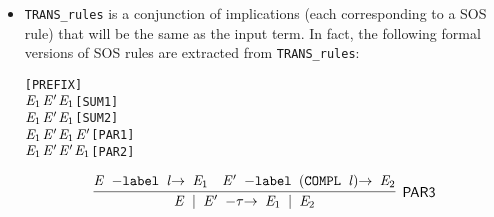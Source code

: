 \begin{itemize}
  \item \texttt{TRANS_rules} is a conjunction of implications (each
    corresponding to a SOS rule) that will be the
    same as the input term. In fact, the following formal versions of SOS rules are
    extracted from \texttt{TRANS_rules}:
\begin{alltt}
\HOLTokenTurnstile{} \HOLSymConst{\ensuremath{\ldotp}} \HOLTokenTransBegin{}\HOLTokenTransEnd {}\hfill\texttt{[PREFIX]}
\HOLTokenTurnstile{}  \HOLTokenTransBegin{}\HOLTokenTransEnd \ensuremath{\HOLFreeVar{E}\sb{\mathrm{1}}} \HOLSymConst{\HOLTokenImp{}}  \HOLSymConst{\ensuremath{+}} \ensuremath{\HOLFreeVar{E}\sp{\prime}} \HOLTokenTransBegin{}\HOLTokenTransEnd \ensuremath{\HOLFreeVar{E}\sb{\mathrm{1}}}\hfill\texttt{[SUM1]}
\HOLTokenTurnstile{}  \HOLTokenTransBegin{}\HOLTokenTransEnd \ensuremath{\HOLFreeVar{E}\sb{\mathrm{1}}} \HOLSymConst{\HOLTokenImp{}} \ensuremath{\HOLFreeVar{E}\sp{\prime}} \HOLSymConst{\ensuremath{+}}  \HOLTokenTransBegin{}\HOLTokenTransEnd \ensuremath{\HOLFreeVar{E}\sb{\mathrm{1}}}\hfill\texttt{[SUM2]}
\HOLTokenTurnstile{}  \HOLTokenTransBegin{}\HOLTokenTransEnd \ensuremath{\HOLFreeVar{E}\sb{\mathrm{1}}} \HOLSymConst{\HOLTokenImp{}}  \HOLSymConst{\ensuremath{\mid}} \ensuremath{\HOLFreeVar{E}\sp{\prime}} \HOLTokenTransBegin{}\HOLTokenTransEnd \ensuremath{\HOLFreeVar{E}\sb{\mathrm{1}}} \HOLSymConst{\ensuremath{\mid}} \ensuremath{\HOLFreeVar{E}\sp{\prime}}\hfill\texttt{[PAR1]}
\HOLTokenTurnstile{}  \HOLTokenTransBegin{}\HOLTokenTransEnd \ensuremath{\HOLFreeVar{E}\sb{\mathrm{1}}} \HOLSymConst{\HOLTokenImp{}} \ensuremath{\HOLFreeVar{E}\sp{\prime}} \HOLSymConst{\ensuremath{\mid}}  \HOLTokenTransBegin{}\HOLTokenTransEnd \ensuremath{\HOLFreeVar{E}\sp{\prime}} \HOLSymConst{\ensuremath{\mid}} \ensuremath{\HOLFreeVar{E}\sb{\mathrm{1}}}\hfill\texttt{[PAR2]}
\end{alltt}
\begin{equation*}
\infer[\HOLRuleName{PAR3}]{\HOLinline{\HOLFreeVar{E} \HOLSymConst{\ensuremath{\mid}} \ensuremath{\HOLFreeVar{E}\sp{\prime}} \HOLTokenTransBegin\HOLSymConst{\ensuremath{\tau}}\HOLTokenTransEnd \ensuremath{\HOLFreeVar{E}\sb{\mathrm{1}}} \HOLSymConst{\ensuremath{\mid}} \ensuremath{\HOLFreeVar{E}\sb{\mathrm{2}}}}}{\HOLinline{\HOLFreeVar{E} \HOLTokenTransBegin\HOLConst{label} \HOLFreeVar{l}\HOLTokenTransEnd \ensuremath{\HOLFreeVar{E}\sb{\mathrm{1}}}}&\HOLinline{\ensuremath{\HOLFreeVar{E}\sp{\prime}} \HOLTokenTransBegin\HOLConst{label} \ensuremath{(}\HOLConst{COMPL} \HOLFreeVar{l}\ensuremath{)}\HOLTokenTransEnd \ensuremath{\HOLFreeVar{E}\sb{\mathrm{2}}}}}

\end{equation*}
\end{itemize}
